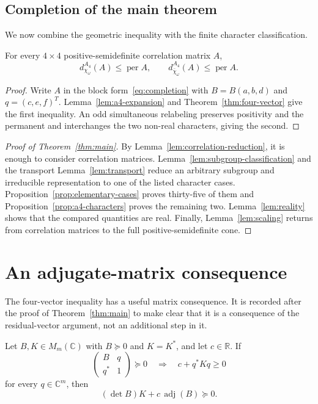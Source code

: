 \documentclass[10pt,twoside]{siamart1116}
\newcommand{\CC}{\mathbb C}
\newcommand{\RR}{\mathbb R}
\newcommand{\per}{\operatorname{per}}
\newcommand{\adj}{\operatorname{adj}}
\newcommand{\mat}[1]{\begin{pmatrix}#1\end{pmatrix}}
\newcommand{\psd}{\succeq 0}
\begin{document}
\subsection{Completion of the main theorem}\label{sec:completion}

We now combine the geometric inequality with the finite character
classification.

\begin{proposition}\label{prop:a4-characters}
For every $4\times4$ positive-semidefinite correlation matrix $A$,
\[
 d_{\chi_\omega}^{A_4}(A)\leq\per A,\qquad
 d_{\bar\chi_\omega}^{A_4}(A)\leq\per A.
\]
\end{proposition}

\begin{proof}
Write $A$ in the block form~\eqref{eq:completion} with
$B=B(a,b,d)$ and $q=(c,e,f)^T$.  Lemma~\ref{lem:a4-expansion} and
Theorem~\ref{thm:four-vector} give the first inequality.  An odd simultaneous
relabeling preserves positivity and the permanent and interchanges the two
non-real characters, giving the second.
\end{proof}

\begin{proof}[Proof of Theorem~\ref{thm:main}]
By Lemma~\ref{lem:correlation-reduction}, it is enough to consider
correlation matrices.  Lemma~\ref{lem:subgroup-classification} and the
transport Lemma~\ref{lem:transport} reduce an arbitrary subgroup and
irreducible representation to one of the listed character cases.
Proposition~\ref{prop:elementary-cases} proves thirty-five of them and
Proposition~\ref{prop:a4-characters} proves the remaining two.
Lemma~\ref{lem:reality} shows that the compared quantities are real.  Finally,
Lemma~\ref{lem:scaling} returns from correlation matrices to the full
positive-semidefinite cone.
\end{proof}

\section{An adjugate-matrix consequence}\label{sec:matrix-consequence}

The four-vector inequality has a useful matrix consequence.  It is recorded
after the proof of Theorem~\ref{thm:main} to make clear that it is a
consequence of the residual-vector argument, not an additional step in it.

\begin{lemma}\label{lem:ellipsoid}
Let $B,K\in M_m(\CC)$ with $B\psd$ and $K=K^*$, and let $c\in\RR$.  If
\[
 \mat{B&q\\q^*&1}\psd\quad\Longrightarrow\quad c+q^*Kq\geq0
\]
for every $q\in\CC^m$, then
\begin{equation}\label{eq:adj-certificate}
 (\det B)K+c\,\adj(B)\psd.
\end{equation}
\end{lemma}
\end{document}
